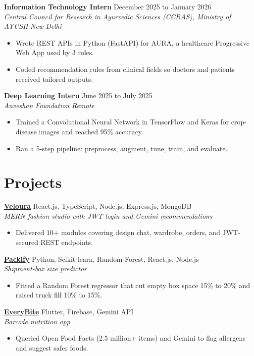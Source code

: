 \documentclass[a4paper,10pt]{article}
\newcommand{\entry}[4]{%
  \vspace{3pt}%
  \noindent\textbf{#1} \hfill #2\\[0.4pt]
  \textit{#3} \hfill \textit{#4}\par
  \vspace{1pt}%
}
\begin{document}
\entry{Information Technology Intern}{December 2025 to January 2026}
{Central Council for Research in Ayurvedic Sciences (CCRAS), Ministry of AYUSH}{New Delhi}
\begin{itemize}
  \item Wrote REST APIs in Python (FastAPI) for AURA, a healthcare Progressive Web App used by 3 roles.
  \item Coded recommendation rules from clinical fields so doctors and patients received tailored outputs.
\end{itemize}

\entry{Deep Learning Intern}{June 2025 to July 2025}
{Anveshan Foundation}{Remote}
\begin{itemize}
  \item Trained a Convolutional Neural Network in TensorFlow and Keras for crop-disease images and reached 95\% accuracy.
  \item Ran a 5-step pipeline: preprocess, augment, tune, train, and evaluate.
\end{itemize}

\section{Projects}
\entry{\href{https://github.com/bushra931/veloura-dream-studio}{Veloura}}{React.js, TypeScript, Node.js, Express.js, MongoDB}
{MERN fashion studio with JWT login and Gemini recommendations}{}
\begin{itemize}
  \item Delivered 10+ modules covering design chat, wardrobe, orders, and JWT-secured REST endpoints.
\end{itemize}

\entry{\href{https://github.com/bushra931/Packify}{Packify}}{Python, Scikit-learn, Random Forest, React.js, Node.js}
{Shipment-box size predictor}{}
\begin{itemize}
  \item Fitted a Random Forest regressor that cut empty box space 15\% to 20\% and raised truck fill 10\% to 15\%.
\end{itemize}

\entry{\href{https://github.com/bushra931/EveryBitee}{EveryBite}}{Flutter, Firebase, Gemini API}
{Barcode nutrition app}{}
\begin{itemize}
  \item Queried Open Food Facts (2.5 million+ items) and Gemini to flag allergens and suggest safer foods.
\end{itemize}
\end{document}
